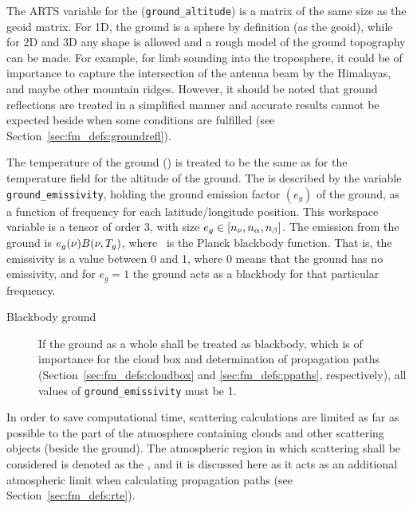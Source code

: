 The ARTS variable for the 
(\verb|ground_altitude|) is a matrix of the same size as the geoid
matrix. For 1D, the ground is a sphere by definition (as the geoid),
while for 2D and 3D any shape is allowed and a rough model of the
ground topography can be made. For example, for limb sounding into the
troposphere, it could be of importance to capture the intersection of
the antenna beam by the Himalayas, and maybe other mountain ridges.
However, it should be noted that ground reflections are treated in a
simplified manner and accurate results cannot be expected beside when
some conditions are fulfilled (see
Section~\ref{sec:fm_defs:groundrefl}).

The temperature of the ground () is
treated to be the same as for the temperature field for the altitude
of the ground. The  is described by the
variable \verb|ground_emissivity|, holding the ground emission factor
$(e_g)$ of the ground, as a function of frequency for each
latitude/longitude position. This workspace variable is a tensor of
order 3, with size $e_g \in
[n_{\nu},n_{\alpha},n_{\beta}]$.  The emission from
the ground is $e_g(\nu)B(\nu,T_{g})$, where \Planck\ is the
Planck blackbody function. That is, the emissivity is a value between
0 and 1, where 0 means that the ground has no emissivity, and for
$e_g=1$ the ground acts as a blackbody for that particular frequency.

\begin{description}
\item[Blackbody ground] If the ground as a
  whole shall be treated as blackbody, which is of importance for the
  cloud box and determination of propagation paths
  (Section~\ref{sec:fm_defs:cloudbox} and \ref{sec:fm_defs:ppaths},
  respectively), all values of \verb|ground_emissivity| must be 1.
\end{description}


\label{sec:fm_defs:cloudbox}

In order to save computational time, scattering calculations are
limited as far as possible to the part of the atmosphere containing
clouds and other scattering objects (beside the ground). The
atmospheric region in which scattering shall be considered is denoted
as the , and it is discussed here as it acts as an
additional atmospheric limit when calculating propagation paths (see
Section~\ref{sec:fm_defs:rte}).

